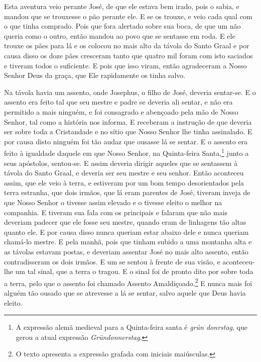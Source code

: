 Esta aventura veio perante José, de que ele estava bem irado, pois o sabia,
e mandou que se trouxesse o pão perante ele. E se os trouxe, e veio cada qual
com o que tinha comprado. Pois que fora alertado sobre sua boca, de que um não
queria como o outro, então mandou ao povo que se sentasse em roda. E ele trouxe
os pães para lá e os colocou no mais alto da távola do Santo Graal e por causa
disso os doze pães cresceram tanto que quatro mil foram com isto saciados e
tiveram todos o suficiente. E pois que isso viram, então agradeceram a Nosso
Senhor Deus da graça, que Ele rapidamente os tinha salvo.

Na távola havia um assento, onde Josephus, o filho de José, deveria
sentar-se. E o assento era feito tal que seu mestre e padre se deveria ali
sentar, e não era permitido a mais ninguém, e foi consagrado e abençoado pela
mão de Nosso Senhor, tal como a história nos informa. E receberam a instrução
de que deveria ser sobre toda a Cristandade e no sítio que Nosso Senhor lhe
tinha assinalado. E por causa disto ninguém foi tão audaz que ousasse lá se
sentar. E o assento era feito à igualdade daquele em que Nosso Senhor, na
Quinta-feira Santa,\footnote{ A expressão alemã medieval para a Quinta-feira
santa é \textit{grún donrstag},  que gerou
a atual expressão \textit{Gründonnerstag}.}  junto a seus
apóstolos, sentou-se. E assim deveria dirigir aqueles que se sentassem à távola
do Santo Graal, e deveria ser seu mestre e seu senhor. Então aconteceu assim,
que ele veio à terra, e estiveram por um bom tempo desorientados pela terra
estranha, que dois irmãos, que lá eram parentes de José, tiveram inveja de que
Nosso Senhor o tivesse assim elevado e o tivesse eleito o melhor na companhia.
E tiveram sua fala com os principais e falaram que não mais
deveriam padecer que ele fosse seu mestre, quando eram de linhagens tão altas
quanto ele. E por causa disso nunca queriam estar abaixo dele e nunca queriam
chamá-lo mestre. E pela manhã, pois que tinham subido a uma montanha alta e as
távolas estavam postas, e deveriam assentar José no mais alto assento, então
contradisseram os dois irmãos. E um se sentou à frente de sua visão, e
aconteceu-lhe um tal sinal, que a terra o tragou. E o sinal foi de pronto dito
por sobre toda a terra, pelo que o assento foi chamado Assento
Amaldiçoado.\footnote{ O texto apresenta a expressão grafada
com iniciais maiúsculas.} E nunca mais foi alguém tão ousado que
se atrevesse a lá se sentar, salvo aquele que Deus havia eleito. 

